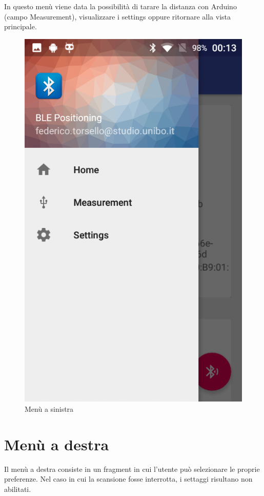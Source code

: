 In questo menù viene data la possibilità di tarare la distanza con Arduino (campo Measurement), visualizzare i settings oppure ritornare alla vista principale.
\begin{figure}[ph]
	\centering
	\includegraphics[width=.35\linewidth]{img/app/04.png}
	\caption{Menù a sinistra}
\end{figure}

\newpage
\section{Menù a destra}

Il menù a destra consiste in un fragment in cui l'utente può selezionare le proprie preferenze. Nel caso in cui la scansione fosse interrotta, i settaggi risultano non abilitati.

